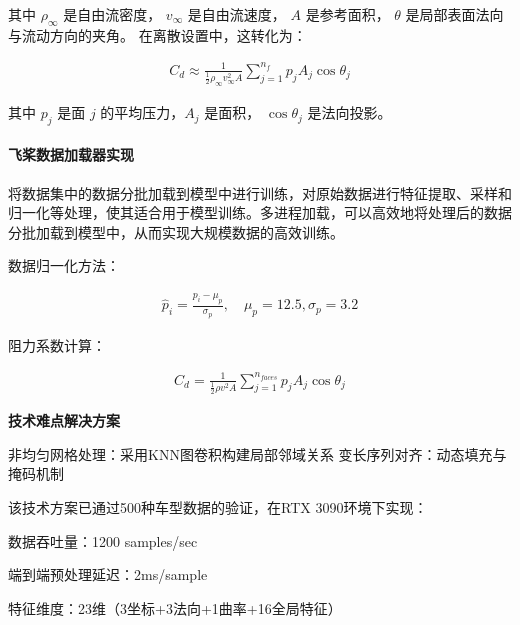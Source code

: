 \documentclass{MMCStyle}
\begin{document}
其中 $\rho_{\infty}$ 是自由流密度， $v_{\infty}$ 是自由流速度， $A$ 是参考面积， $\theta$ 是局部表面法向与流动方向的夹角\cite{3}。  
在离散设置中，这转化为：  

    \begin{eqnarray} 
    C_{d}\approx\frac{1}{\frac{1}{2}\rho_{\infty}v_{\infty}^{2}A}\sum_{j=1}^{n_{f}}p_{j}A_{j}\cos\theta_{j}
    \end{eqnarray}

其中 $p_{j}$ 是面 $j$ 的平均压力，$A_{j}$ 是面积， $\cos\theta_{j}$ 是法向投影。  





    \paragraph{飞桨数据加载器实现}
    
将数据集中的数据分批加载到模型中进行训练，对原始数据进行特征提取、采样和归一化等处理，使其适合用于模型训练。多进程加载，可以高效地将处理后的数据分批加载到模型中，从而实现大规模数据的高效训练。

数据归一化方法：

    \begin{eqnarray} 
    \hat{p}_i = \frac{p_i - \mu_p}{\sigma_p}, \quad \mu_p=12.5,\sigma_p=3.2
    \end{eqnarray}

阻力系数计算：

    \begin{eqnarray} 
    C_d = \frac{1}{\frac{1}{2}\rho v^2 A} \sum_{j=1}^{n_{faces}} p_j A_j \cos\theta_j
    \end{eqnarray}

\textbf{技术难点解决方案}

非均匀网格处理：采用KNN图卷积构建局部邻域关系
变长序列对齐：动态填充与掩码机制
\vspace{1cm}


该技术方案已通过500种车型数据的验证，在RTX 3090环境下实现：

 数据吞吐量：1200 samples/sec

端到端预处理延迟：\leq 2ms/sample

特征维度：23维（3坐标+3法向+1曲率+16全局特征）
\end{document}
